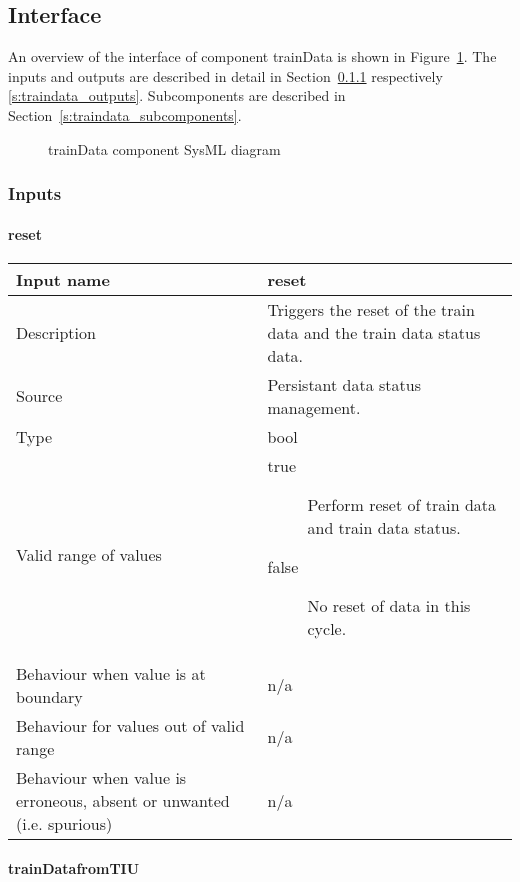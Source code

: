 \subsection{Interface}

An overview of the interface of component trainData is shown in Figure~\ref{f:traindata_interface}. The inputs and outputs are described in detail in Section~\ref{s:traindata_inputs} respectively \ref{s:traindata_outputs}. Subcomponents are described in Section~\ref{s:traindata_subcomponents}.

\begin{figure}
\center
{}
\caption{trainData component SysML diagram}\label{f:traindata_interface}
\end{figure}


\subsubsection{Inputs}\label{s:traindata_inputs}

\paragraph{reset}

\begin{longtable}{p{}p{}}
\toprule
Input name				& reset \\
\midrule
Description				& Triggers the reset of the train data and the train data status data.\\
\midrule
Source					& Persistant data status management.\\ 
\midrule
Type					& bool \\
\midrule
Valid range of values	& 
\begin{description}
\item[true] Perform reset of train data and train data status.
\item[false] No reset of data in this cycle.
\end{description}
\\
\midrule
Behaviour when value is at boundary	& n/a \\
\midrule
Behaviour for values out of valid range	& n/a \\
\midrule
Behaviour when value is erroneous, absent or unwanted (i.e. spurious) & n/a \\
\bottomrule
\end{longtable}

\paragraph{trainDatafromTIU}


